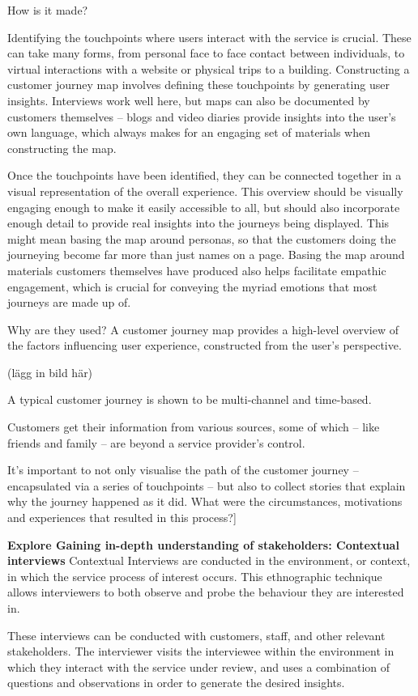 How is it made?

Identifying the touchpoints where users interact with the service is crucial. These can take many forms, from personal face to face contact between individuals, to virtual interactions with a website or physical trips to a building. Constructing a customer journey map involves defining these touchpoints by generating user insights. Interviews work well here, but maps can also be documented by customers themselves – blogs and video diaries provide insights into the user’s own language, which always makes for an engaging set of materials when constructing the map.

Once the touchpoints have been identified, they can be connected together in a visual representation of the overall experience. This overview should be visually engaging enough to make it easily accessible to all, but should also incorporate enough detail to provide real insights into the journeys being displayed. This might mean basing the map around personas, so that the customers doing the journeying become far more than just names on a page. Basing the map around materials customers themselves have produced also helps facilitate empathic engagement, which is crucial for conveying the myriad emotions that most journeys are made up of.

Why are they used?
A customer journey map provides a high-level overview of the factors influencing user experience, constructed from the user’s perspective.

(lägg in bild här)

A typical customer journey is shown to be multi-channel and time-based.

Customers get their information from various sources, some of which – like friends and family – are beyond a service provider’s control.

It’s important to not only visualise the path of the customer journey – encapsulated via a series of touchpoints – but also to collect stories that explain why the journey happened as it did. What were the circumstances, motivations and experiences that resulted in this process?]

\textbf{Explore Gaining in-depth understanding of stakeholders: Contextual interviews}
Contextual Interviews are conducted in the environment, or context, in which the service process of interest occurs. This ethnographic technique allows interviewers to both observe and probe the behaviour they are interested in.

These interviews can be conducted with customers, staff, and other relevant stakeholders. The interviewer visits the interviewee within the environment in which they interact with the service under review, and uses a combination of questions and observations in order to generate the desired insights.

